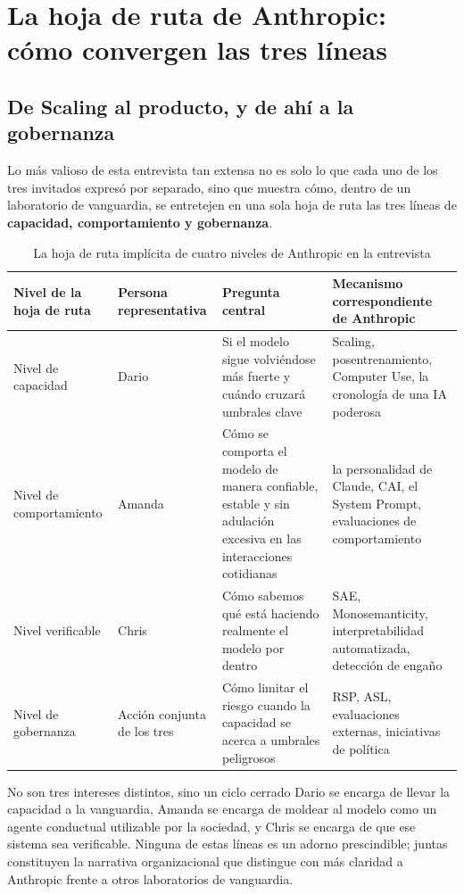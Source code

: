 \section{La hoja de ruta de Anthropic: cómo convergen las tres líneas}

\subsection{De Scaling al producto, y de ahí a la gobernanza}

Lo más valioso de esta entrevista tan extensa no es solo lo que cada uno de los tres invitados expresó por separado, sino que muestra cómo, dentro de un laboratorio de vanguardia, se entretejen en una sola hoja de ruta las tres líneas de \textbf{capacidad, comportamiento y gobernanza}.

\begin{table}[H]
\centering
\begin{tabular}{p{} p{} p{} p{}}
\toprule
Nivel de la hoja de ruta & Persona representativa & Pregunta central & Mecanismo correspondiente de Anthropic \\
\midrule
Nivel de capacidad & Dario & Si el modelo sigue volviéndose más fuerte y cuándo cruzará umbrales clave & Scaling, posentrenamiento, Computer Use, la cronología de una IA poderosa \\
Nivel de comportamiento & Amanda & Cómo se comporta el modelo de manera confiable, estable y sin adulación excesiva en las interacciones cotidianas & la personalidad de Claude, CAI, el System Prompt, evaluaciones de comportamiento \\
Nivel verificable & Chris & Cómo sabemos qué está haciendo realmente el modelo por dentro & SAE, Monosemanticity, interpretabilidad automatizada, detección de engaño \\
Nivel de gobernanza & Acción conjunta de los tres & Cómo limitar el riesgo cuando la capacidad se acerca a umbrales peligrosos & RSP, ASL, evaluaciones externas, iniciativas de política \\
\bottomrule
\end{tabular}
\caption{La hoja de ruta implícita de cuatro niveles de Anthropic en la entrevista}
\end{table}

\begin{importantbox}{No son tres intereses distintos, sino un ciclo cerrado}
Dario se encarga de llevar la capacidad a la vanguardia, Amanda se encarga de moldear al modelo como un agente conductual utilizable por la sociedad, y Chris se encarga de que ese sistema sea verificable. Ninguna de estas líneas es un adorno prescindible; juntas constituyen la narrativa organizacional que distingue con más claridad a Anthropic frente a otros laboratorios de vanguardia.
\end{importantbox}

